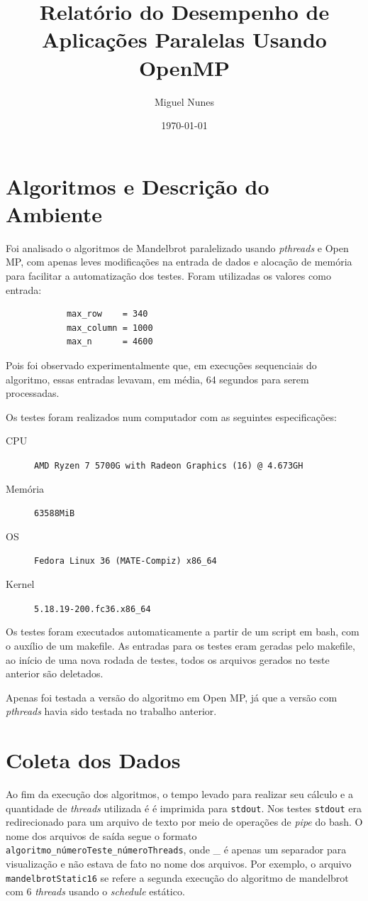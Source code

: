 \documentclass[10pt,a4paper]{article}
\title{Relatório do Desempenho de Aplicações Paralelas Usando OpenMP}
\author{Miguel Nunes}
\date{\today}
\begin{document}
	\maketitle

	\section{Algoritmos e Descrição do Ambiente}

		Foi analisado o algoritmos de Mandelbrot paralelizado usando \textit{pthreads} e Open MP, 
		com apenas leves modificações na entrada de dados e alocação de memória para facilitar a automatização dos testes.
		Foram utilizadas os valores como entrada: 
		
		\begin{verbatim}
			max_row    = 340
			max_column = 1000
			max_n      = 4600
		\end{verbatim}

		Pois foi observado experimentalmente que, em execuções sequenciais do algoritmo, essas entradas levavam, em média, 
		64 segundos para serem processadas.

		Os testes foram realizados num computador com as seguintes especificações:

		\begin{description}
			\item[CPU] \texttt{AMD Ryzen 7 5700G with Radeon Graphics (16) @ 4.673GH}
			\item[Memória] \texttt{63588MiB}
			\item[OS] \texttt{Fedora Linux 36 (MATE-Compiz) x86\_64}
			\item[Kernel] \texttt{5.18.19-200.fc36.x86\_64}
		\end{description}

		Os testes foram executados automaticamente a partir de um script em bash, com o auxílio de um makefile. As entradas para os 
		testes eram geradas pelo makefile, ao início de uma nova rodada de testes, todos os arquivos gerados no teste anterior são deletados.

		Apenas foi testada a versão do algoritmo em Open MP, já que a versão com \textit{pthreads} havia sido testada no trabalho anterior.

	\section{Coleta dos Dados}
		
		Ao fim da execução dos algoritmos, o tempo levado para realizar seu cálculo e a quantidade de \textit{threads} utilizada é
		é imprimida para \texttt{stdout}. Nos testes \texttt{stdout} era redirecionado para um arquivo de texto por meio de 
		operações de \textit{pipe} do bash. O nome dos arquivos de saída segue o formato \break \texttt{algoritmo\_númeroTeste\_númeroThreads}, 
		onde \_ é apenas um separador para visualização e não estava de fato no nome dos arquivos.
		Por exemplo, o arquivo \texttt{mandelbrotStatic16} se refere a segunda execução do algoritmo de mandelbrot com 6 \textit{threads} usando
		o \textit{schedule} estático.
\end{document}
